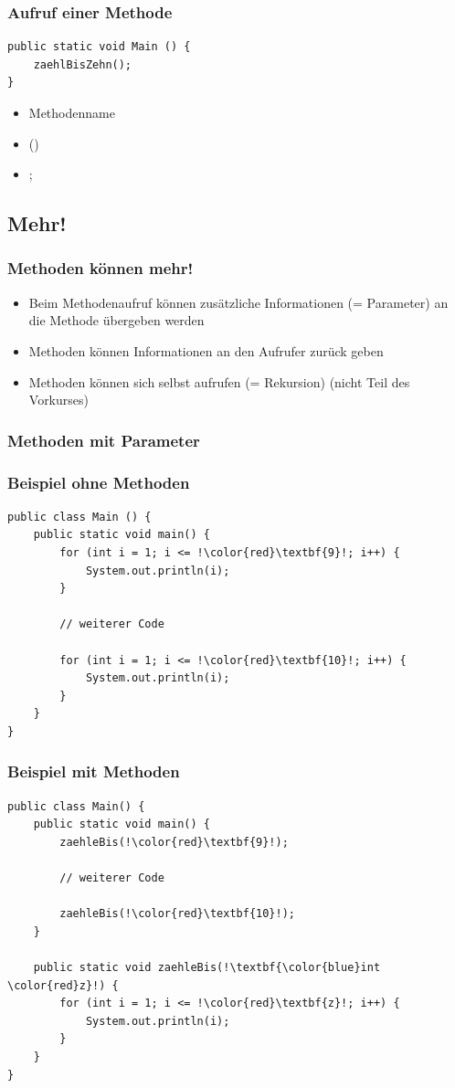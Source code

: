 \documentclass[final]{beamer}
\begin{document}
\begin{frame}[containsverbatim]
	\frametitle{Aufruf einer Methode}
	\begin{lstlisting}
public static void Main () {
	zaehlBisZehn();
}
	\end{lstlisting}
	\begin{itemize}
		\item{Methodenname}
		\item{()}
		\item{;}
	\end{itemize}
\end{frame}

\subsection{Mehr!}
\begin{frame}
	\frametitle{Methoden können mehr!}
	\begin{itemize}
		\item{Beim Methodenaufruf können zusätzliche Informationen (= Parameter) an die Methode übergeben werden}
		\item{Methoden können Informationen an den Aufrufer zurück geben}
		\item{Methoden können sich selbst aufrufen (= Rekursion) (nicht Teil des Vorkurses)}
	\end{itemize}
\end{frame}

\subsubsection{Methoden mit Parameter}
\begin{frame}[containsverbatim]
	\frametitle{Beispiel ohne Methoden}
	\begin{lstlisting}[escapechar=!]
public class Main () {
	public static void main() {
		for (int i = 1; i <= !\color{red}\textbf{9}!; i++) {
			System.out.println(i);
		}
		
		// weiterer Code
		
		for (int i = 1; i <= !\color{red}\textbf{10}!; i++) {
			System.out.println(i);
		}
	}
}
	\end{lstlisting}
\end{frame}

\begin{frame}[containsverbatim]
	\frametitle{Beispiel mit Methoden}
	\begin{lstlisting}[escapechar=!]
public class Main() {
	public static void main() {
		zaehleBis(!\color{red}\textbf{9}!);
		
		// weiterer Code
		
		zaehleBis(!\color{red}\textbf{10}!);
	}

	public static void zaehleBis(!\textbf{\color{blue}int \color{red}z}!) {
		for (int i = 1; i <= !\color{red}\textbf{z}!; i++) {
			System.out.println(i);
		}
	}
}
	\end{lstlisting}
\end{frame}
\end{document}
